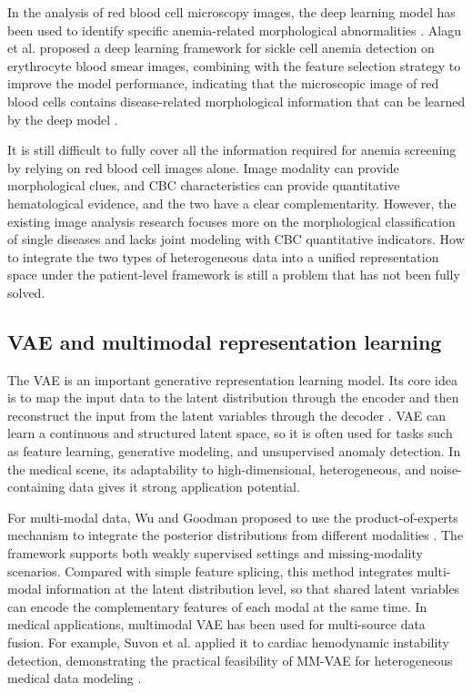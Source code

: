 \documentclass[conference]{IEEEtran}
\begin{document}
In the analysis of red blood cell microscopy images, the deep learning model has been used to identify specific anemia-related morphological abnormalities \cite{ref6}. Alagu et al. proposed a deep learning framework for sickle cell anemia detection on erythrocyte blood smear images, combining with the feature selection strategy to improve the model performance, indicating that the microscopic image of red blood cells contains disease-related morphological information that can be learned by the deep model \cite{ref7}.

It is still difficult to fully cover all the information required for anemia screening by relying on red blood cell images alone. Image modality can provide morphological clues, and CBC characteristics can provide quantitative hematological evidence, and the two have a clear complementarity. However, the existing image analysis research focuses more on the morphological classification of single diseases and lacks joint modeling with CBC quantitative indicators. How to integrate the two types of heterogeneous data into a unified representation space under the patient-level framework is still a problem that has not been fully solved.

\subsection{VAE and multimodal representation learning}

The VAE is an important generative representation learning model. Its core idea is to map the input data to the latent distribution through the encoder and then reconstruct the input from the latent variables through the decoder \cite{ref8}. VAE can learn a continuous and structured latent space, so it is often used for tasks such as feature learning, generative modeling, and unsupervised anomaly detection. In the medical scene, its adaptability to high-dimensional, heterogeneous, and noise-containing data gives it strong application potential.

For multi-modal data, Wu and Goodman proposed to use the product-of-experts mechanism to integrate the posterior distributions from different modalities \cite{ref9}. The framework supports both weakly supervised settings and missing-modality scenarios. Compared with simple feature splicing, this method integrates multi-modal information at the latent distribution level, so that shared latent variables can encode the complementary features of each modal at the same time. In medical applications, multimodal VAE has been used for multi-source data fusion. For example, Suvon et al. applied it to cardiac hemodynamic instability detection, demonstrating the practical feasibility of MM-VAE for heterogeneous medical data modeling \cite{ref10}.
\end{document}
